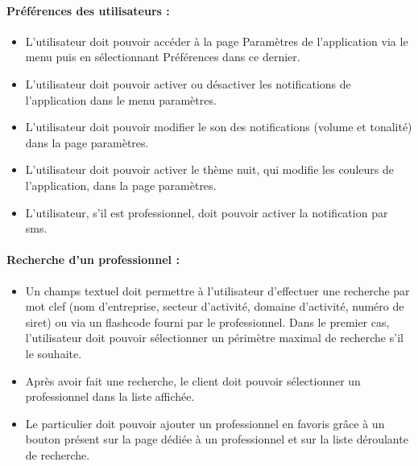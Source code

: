 \documentclass{article}
\begin{document}
\paragraph{Préférences des utilisateurs :}
\begin{itemize}
\item L'utilisateur doit pouvoir accéder à la page \og Paramètres \fg{} de l'application via le menu
 puis en sélectionnant \og Préférences \fg{}
  dans ce dernier.
\item L'utilisateur doit pouvoir activer ou désactiver les notifications
  de l'application dans le menu paramètres.
\item L'utilisateur doit pouvoir modifier le son des notifications
  (volume et tonalité) dans la page paramètres.
\item L'utilisateur doit pouvoir activer le thème nuit, qui modifie les
  couleurs de l'application, dans la page paramètres.
\item L'utilisateur, s'il est professionnel, doit pouvoir activer la notification par sms.
\end{itemize}
\paragraph{Recherche d'un professionnel :}
\begin{itemize}
\item Un champs textuel doit permettre à l'utilisateur d'effectuer une
  recherche par mot clef (nom d'entreprise, secteur d'activité, domaine d'activité, numéro de siret) ou via un flashcode fourni par le professionnel. Dans
  le premier cas, l'utilisateur doit pouvoir sélectionner
  un périmètre maximal de recherche s'il le souhaite.
\item Après avoir fait une recherche, le client doit pouvoir sélectionner un
  professionnel dans la liste affichée.
\item Le particulier doit pouvoir ajouter un professionnel en favoris grâce
  à un bouton présent sur la page dédiée à un professionnel et sur la
  liste déroulante de recherche.


\end{itemize}
\end{document}
